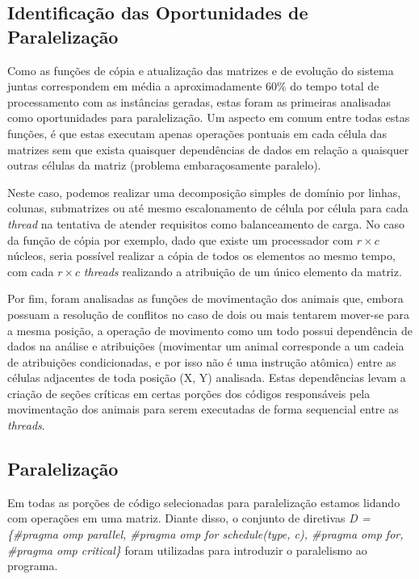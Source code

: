 \documentclass[a4paper, 12pt]{article}
\begin{document}
\subsection{Identificação das Oportunidades de Paralelização}

Como as funções de cópia e atualização das matrizes e de evolução do sistema juntas correspondem em média a aproximadamente 60\% do tempo total de processamento com as instâncias geradas, estas foram as primeiras analisadas como oportunidades para paralelização. Um aspecto em comum entre todas estas funções, é que estas executam apenas operações pontuais em cada célula das matrizes sem que exista quaisquer dependências de dados em relação a quaisquer outras células da matriz (problema embaraçosamente paralelo).

Neste caso, podemos realizar uma decomposição simples de domínio por linhas, colunas, submatrizes ou até mesmo escalonamento de célula por célula para cada \emph{thread} na tentativa de atender requisitos como balanceamento de carga. No caso da função de cópia por exemplo, dado que existe um processador com \(r \times c\) núcleos, seria possível realizar a cópia de todos os elementos ao mesmo tempo, com cada \(r \times c\) \emph{threads} realizando a atribuição de um único elemento da matriz.

Por fim, foram analisadas as funções de movimentação dos animais que, embora possuam a resolução de conflitos no caso de dois ou mais tentarem mover-se para a mesma posição, a operação de movimento como um todo possui dependência de dados na análise e atribuições (movimentar um animal corresponde a um cadeia de atribuições condicionadas, e por isso não é uma instrução atômica) entre as células adjacentes de toda posição (X, Y) analisada. Estas dependências levam a criação de seções críticas em certas porções dos códigos responsáveis pela movimentação dos animais para serem executadas de forma sequencial entre as \emph{threads}.

\subsection{Paralelização}

Em todas as porções de código selecionadas para paralelização estamos lidando com operações em uma matriz. Diante disso, o conjunto de diretivas \textit{D = \{\#pragma omp parallel, \#pragma omp for schedule(type, c), \#pragma omp for, \#pragma omp critical\}} foram utilizadas para introduzir o paralelismo ao programa.
\end{document}
